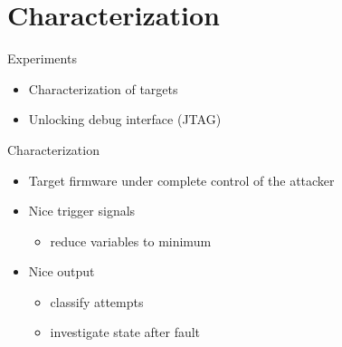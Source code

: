 \documentclass[table]{beamer}
\begin{document}
\section{Characterization}
\begin{frame}
    \tableofcontents[currentsection]
\end{frame}


\begin{frame}{Experiments}
    \begin{itemize}
        \item Characterization of targets
        \item Unlocking debug interface (JTAG)
    \end{itemize}
\end{frame}

\begin{frame}{Characterization}
    \begin{itemize}
        \item[] Target firmware under complete control of the attacker
    \end{itemize}
    \begin{itemize}
      \item[] Nice trigger signals
      \begin{itemize}
        \item reduce variables to minimum
      \end{itemize} 
      \item[] Nice output
      \begin{itemize}
        \item classify attempts
        \item investigate state after fault
      \end{itemize} 
    \end{itemize}

    
\end{frame}

\end{document}
